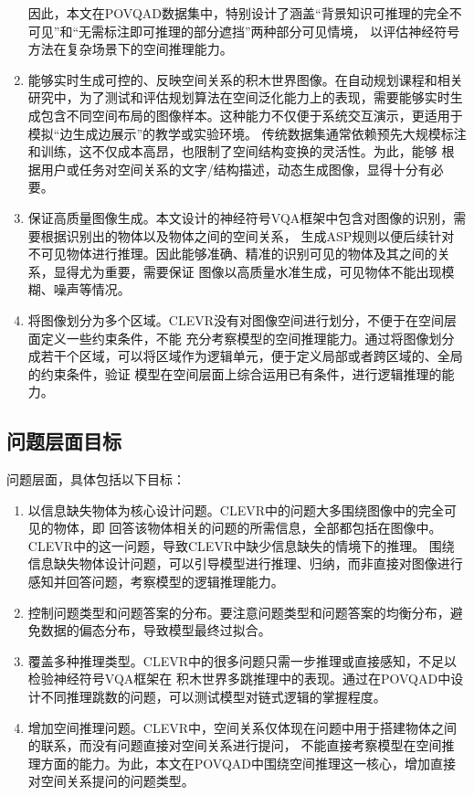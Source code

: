 \begin{enumerate}[nosep]
因此，本文在POVQAD数据集中，特别设计了涵盖“背景知识可推理的完全不可见”和“无需标注即可推理的部分遮挡”两种部分可见情境，
以评估神经符号方法在复杂场景下的空间推理能力。
\item 能够实时生成可控的、反映空间关系的积木世界图像。在自动规划课程和相关研究中，为了测试和评估规划算法在空间泛化能力上的表现，需要能够实时生成包含不同空间布局的图像样本。这种能力不仅便于系统交互演示，更适用于模拟“边生成边展示”的教学或实验环境。
传统数据集通常依赖预先大规模标注和训练，这不仅成本高昂，也限制了空间结构变换的灵活性。为此，能够
根据用户或任务对空间关系的文字/结构描述，动态生成图像，显得十分有必要。
\item 保证高质量图像生成。本文设计的神经符号VQA框架中包含对图像的识别，需要根据识别出的物体以及物体之间的空间关系，
生成ASP规则以便后续针对不可见物体进行推理。因此能够准确、精准的识别可见的物体及其之间的关系，显得尤为重要，需要保证
图像以高质量水准生成，可见物体不能出现模糊、噪声等情况。
\item 将图像划分为多个区域。CLEVR没有对图像空间进行划分，不便于在空间层面定义一些约束条件，不能
充分考察模型的空间推理能力。通过将图像划分成若干个区域，可以将区域作为逻辑单元，便于定义局部或者跨区域的、全局的约束条件，验证
模型在空间层面上综合运用已有条件，进行逻辑推理的能力。
\end{enumerate}
\subsection{问题层面目标}
问题层面，具体包括以下目标：
\begin{enumerate}[nosep]
\item 以信息缺失物体为核心设计问题。CLEVR中的问题大多围绕图像中的完全可见的物体，即
回答该物体相关的问题的所需信息，全部都包括在图像中。CLEVR中的这一问题，导致CLEVR中缺少信息缺失的情境下的推理。
围绕信息缺失物体设计问题，可以引导模型进行推理、归纳，而非直接对图像进行感知并回答问题，考察模型的逻辑推理能力。
\item 控制问题类型和问题答案的分布。要注意问题类型和问题答案的均衡分布，避免数据的偏态分布，导致模型最终过拟合。
\item 覆盖多种推理类型。CLEVR中的很多问题只需一步推理或直接感知，不足以检验神经符号VQA框架在
积木世界多跳推理中的表现。通过在POVQAD中设计不同推理跳数的问题，可以测试模型对链式逻辑的掌握程度。
\item 增加空间推理问题。CLEVR中，空间关系仅体现在问题中用于搭建物体之间的联系，而没有问题直接对空间关系进行提问，
不能直接考察模型在空间推理方面的能力。为此，本文在POVQAD中围绕空间推理这一核心，增加直接对空间关系提问的问题类型。
\end{enumerate}
